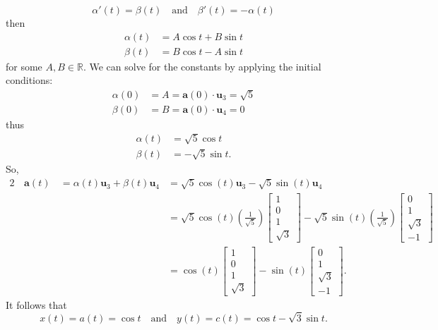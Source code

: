 \documentclass{exam}
\newcommand{\RR}{\mathbb R}
\begin{document}
\begin{questions}
\begin{solution}
\[            \alpha'(t) = \beta(t) \quad\text{and}\quad \beta'(t) = -\alpha(t)
        \]
        then 
        \begin{align*}
            \alpha(t) &= A\cos t + B\sin t \\
            \beta(t) &= B\cos t - A\sin t
        \end{align*}
        for some $A, B \in \RR$. We can solve for the constants by applying the initial conditions:
        \begin{align*}
            \alpha(0) &= A = \mathbf{a}(0) \cdot \mathbf{u}_3 = \sqrt{5} \\
            \beta(0) &= B = \mathbf{a}(0) \cdot \mathbf{u}_4 = 0
        \end{align*}
        thus 
        \begin{align*}
            \alpha(t) &= \sqrt{5}\cos t \\
            \beta(t) &= -\sqrt{5}\sin t.
        \end{align*}
        So, 
        \begin{alignat*}{2}
            &\, \mathbf{a}(t)\, &= \alpha(t)\mathbf{u}_3 + \beta(t)\mathbf{u}_4 &= \sqrt{5}\cos(t)\mathbf{u}_3 - \sqrt{5}\sin(t)\mathbf{u}_4 \\
            &&&= \sqrt{5}\cos(t)\left(\frac{1}{\sqrt{5}}\right)\begin{bmatrix}
                1 \\ 0 \\ 1 \\ \sqrt{3}
            \end{bmatrix} - \sqrt{5}\sin(t)\left(\frac{1}{\sqrt{5}}\right)\begin{bmatrix}
                0 \\ 1 \\ \sqrt{3} \\ -1
            \end{bmatrix} \\
            &&&= \cos(t)\begin{bmatrix}
                1 \\ 0 \\ 1 \\ \sqrt{3}
            \end{bmatrix} - \sin(t)\begin{bmatrix}
                0 \\ 1 \\ \sqrt{3} \\ -1
            \end{bmatrix}.
        \end{alignat*}
        It follows that 
        \[
            x(t) = a(t) = \cos t \quad\text{and}\quad y(t) = c(t) = \cos t - \sqrt{3}\sin t.
        \]
    \end{solution}


\end{questions}
\end{document}
